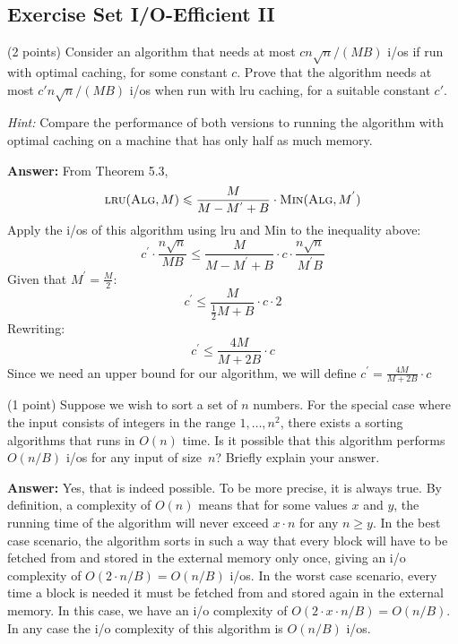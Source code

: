 \documentclass{article}
\renewcommand{\leq}{\leqslant}
\renewcommand{\geq}{\geqslant}
\newcommand{\io}{{\sc i/o}\xspace}
\newcommand{\ios}{{\io}s\xspace}
\newcommand{\lru}{{\sc lru}\xspace}
\newcounter{rcounter}
\newenvironment{rlist}%
{\begin{list}{\setnr-\arabic{rcounter}}{\usecounter{rcounter}}}{\end{list}}
\begin{document}
\subsection*{Exercise Set I/O-Efficient II}
\begin{rlist}

\item (2 points)
    Consider an algorithm that needs at most $c n\sqrt{n} / (MB)$ \ios if run with optimal caching, for some constant $c$. Prove that the algorithm needs at most $c' n\sqrt{n} / (MB)$ \ios when run with \lru caching, for a suitable constant $c'$.
    
    \emph{Hint:} Compare the performance of both versions to running the algorithm with optimal caching on a machine that has only half as much memory.
    
    \textbf{Answer:}
        From Theorem 5.3, 
        $$\textrm{\lru}(\textrm{\sc Alg}, M) \leq \frac{M}{M-M^{'}+B} \cdot \textrm{\sc Min}(\textrm{\sc Alg}, M^{'})$$
        Apply the \ios of this algorithm using \lru and {\sc Min} to the inequality above:
        $$c^{'} \cdot \frac{n \sqrt{n}}{MB} \leq \frac{M}{M-M^{'}+B} \cdot c \cdot \frac{n \sqrt{n}}{M^{'}B}$$
        Given that $M^{'} = \frac{M}{2}$:
        $$c^{'} \leq \frac{M}{\frac{1}{2}M+B} \cdot c \cdot 2$$
        Rewriting:
        $$c^{'} \leq \frac{4M}{M+2B} \cdot c$$
        Since we need an upper bound for our algorithm, we will define $c^{'} = \frac{4M}{M+2B} \cdot c$

\item (1 point)
    Suppose we wish to sort a set of $n$ numbers. For the special case where the input consists of integers in the range $1,\ldots,n^2$, there exists a sorting algorithms that runs in $O(n)$ time. Is it possible that this algorithm performs $O(n/B)$ \ios for any input of size~$n$? Briefly explain your answer.
    
    \textbf{Answer:}
    Yes, that is indeed possible. To be more precise, it is always true. By definition, a complexity of $O(n)$ means that for some values $x$ and $y$, the running time of the algorithm will never exceed $x \cdot n$ for any $n \geq y$. In the best case scenario, the algorithm sorts in such a way that every block will have to be fetched from and stored in the external memory only once, giving an \io complexity of $O(2 \cdot n/B)=O(n/B)$ \ios. In the worst case scenario, every time a block is needed it must be fetched from and stored again in the external memory. In this case, we have an \io complexity of $O(2 \cdot x \cdot n/B) = O(n/B)$. In any case the \io complexity of this algorithm is $O(n/B)$ \ios.


\end{rlist}
\end{document}
